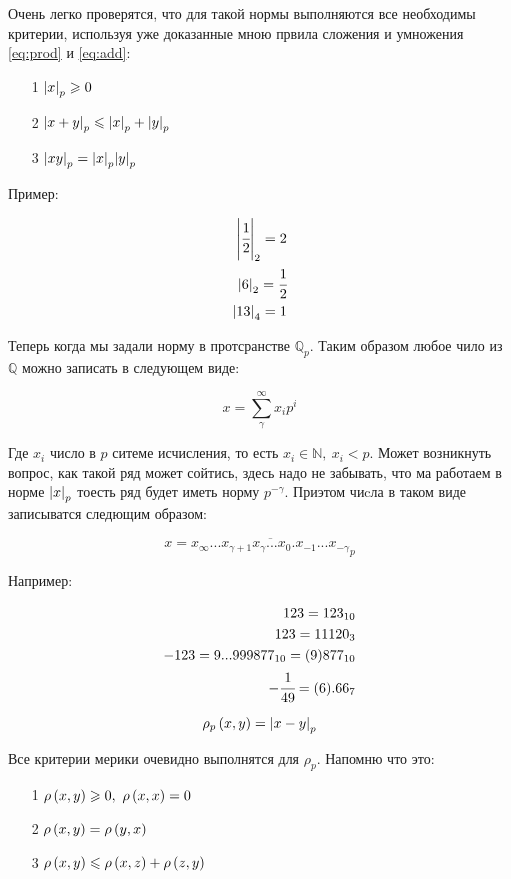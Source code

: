 Очень легко проверятся, что для такой 
нормы выполняются все необходимы критерии, используя уже доказанные мною 
првила сложения и умножения \ref{eq:prod} и \ref{eq:add}:
\begin{itemize}
    \item[1] $\abs{x}_p \geqslant 0$
    \item[2] $\abs{x+y}_p \leqslant \abs{x}_p + \abs{y}_p$
    \item[3] $\abs{xy}_p = \abs{x}_p \abs{y}_p$
\end{itemize} 

Пример:

\begin{eqnarray*}
    \abs{\cfrac{1}{2}}_2 = 2\\
    \abs{6}_2 = \cfrac{1}{2}\\
    \abs{13}_4 = 1
\end{eqnarray*}

Теперь когда мы задали норму в протсранстве $\mathbb{Q}_p$. 
Таким образом любое чило из $\mathbb{Q}$ можно записать в следующем виде:

\begin{equation}
    \label{def:sum}
    x = \sum_{\gamma}^{\infty} x_i p^i
\end{equation}

Где $x_i$ число в $p$ ситеме исчисления, то есть $x_i \in \mathbb{N},\ x_i < p$. 
Может возникнуть вопрос, как такой ряд может сойтись, здесь надо не забывать, что 
ма работаем в норме $\abs{x}_p$ тоесть ряд будет иметь норму $p^{-\gamma}$.
Приэтом чиcла в таком виде записыватся следющим образом:

\begin{equation}
    x = \overline{x_{\infty} ... x_{\gamma + 1} x_{\gamma} ... x_{0}. x_{-1} ... x_{-\gamma}}_p
\end{equation}

Например:

\begin{eqnarray*}
    123 = 123_{10}\\
    123 = 11120_3\\
    -123 = 9...999877_{10} = (9)877_{10}\\
    -\cfrac{1}{49} = (6).66_7
\end{eqnarray*}

\begin{equation}
    \label{def:metric}
    \rho_p\left( x, y \right) = \abs{x - y}_p  
\end{equation}

Все критерии мерики очевидно выполнятся для $\rho_p$. Напомню
что это:
\begin{itemize}
    \item[1] $\rho\left( x, y \right) \geqslant 0, \   \rho\left( x, x \right) = 0$
    \item[2] $\rho\left( x, y \right) = \rho\left( y, x \right)$
    \item[3] $\rho\left( x, y \right) \leqslant \rho\left( x, z \right) + \rho\left( z, y \right)$ 
\end{itemize} 


